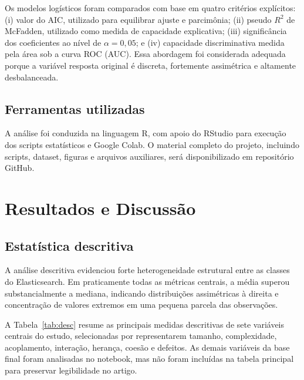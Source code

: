\documentclass[12pt]{article}
\begin{document}
Os modelos logísticos foram comparados com base em quatro critérios explícitos: (i) valor do AIC, utilizado para equilibrar ajuste e parcimônia; (ii) pseudo $R^2$ de McFadden, utilizado como medida de capacidade explicativa; (iii) significância dos coeficientes ao nível de \(\alpha = 0{,}05\); e (iv) capacidade discriminativa medida pela área sob a curva ROC (AUC). Essa abordagem foi considerada adequada porque a variável resposta original é discreta, fortemente assimétrica e altamente desbalanceada.

\subsection{Ferramentas utilizadas}

A análise foi conduzida na linguagem R, com apoio do RStudio para execução dos scripts estatísticos e Google Colab. O material completo do projeto, incluindo scripts, dataset, figuras e arquivos auxiliares, será disponibilizado em repositório GitHub.

\section{Resultados e Discussão}

\subsection{Estatística descritiva}

A análise descritiva evidenciou forte heterogeneidade estrutural entre as classes do Elasticsearch. Em praticamente todas as métricas centrais, a média superou substancialmente a mediana, indicando distribuições assimétricas à direita e concentração de valores extremos em uma pequena parcela das observações.

A Tabela~\ref{tab:desc} resume as principais medidas descritivas de sete variáveis centrais do estudo, selecionadas por representarem tamanho, complexidade, acoplamento, interação, herança, coesão e defeitos. As demais variáveis da base final foram analisadas no notebook, mas não foram incluídas na tabela principal para preservar legibilidade no artigo.
\end{document}
